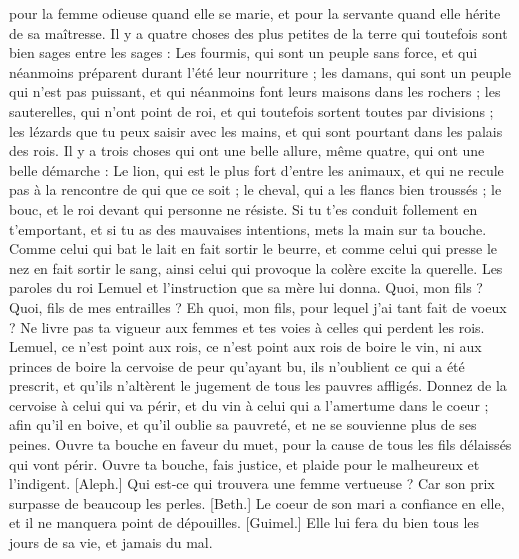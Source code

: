 \begin{multicols}{2}
pour la femme odieuse quand elle se marie, et pour la servante quand elle hérite de sa maîtresse.
Il y a quatre choses des plus petites de la terre qui toutefois sont bien sages entre les sages :
Les fourmis, qui sont un peuple sans force, et qui néanmoins préparent durant l'été leur nourriture ;
les damans, qui sont un peuple qui n’est pas puissant, et qui néanmoins font leurs maisons dans les rochers ;
les sauterelles, qui n'ont point de roi, et qui toutefois sortent toutes par divisions ;
les lézards que tu peux saisir avec les mains, et qui sont pourtant dans les palais des rois.
Il y a trois choses qui ont une belle allure, même quatre, qui ont une belle démarche :
Le lion, qui est le plus fort d'entre les animaux, et qui ne recule pas à la rencontre de qui que ce soit ;
le cheval, qui a les flancs bien troussés ; le bouc, et le roi devant qui personne ne résiste.
Si tu t’es conduit follement en t’emportant, et si tu as des mauvaises intentions, mets la main sur ta bouche.
Comme celui qui bat le lait en fait sortir le beurre, et comme celui qui presse le nez en fait sortir le sang, ainsi celui qui provoque la colère excite la querelle.
\VerseOne{}Les paroles du roi Lemuel et l'instruction que sa mère lui donna.
Quoi, mon fils ? Quoi, fils de mes entrailles ? Eh quoi, mon fils, pour lequel j'ai tant fait de voeux ?
Ne livre pas ta vigueur aux femmes et tes voies à celles qui perdent les rois.
Lemuel, ce n'est point aux rois, ce n'est point aux rois de boire le vin, ni aux princes de boire la cervoise
de peur qu'ayant bu, ils n'oublient ce qui a été prescrit, et qu'ils n'altèrent le jugement de tous les pauvres affligés.
Donnez de la cervoise à celui qui va périr, et du vin à celui qui a l'amertume dans le coeur ;
afin qu'il en boive, et qu'il oublie sa pauvreté, et ne se souvienne plus de ses peines.
Ouvre ta bouche en faveur du muet, pour la cause de tous les fils délaissés qui vont périr.
Ouvre ta bouche, fais justice, et plaide pour le malheureux et l’indigent.
[Aleph.] Qui est-ce qui trouvera une femme vertueuse ? Car son prix surpasse de beaucoup les perles.
[Beth.] Le coeur de son mari a confiance en elle, et il ne manquera point de dépouilles.
[Guimel.] Elle lui fera du bien tous les jours de sa vie, et jamais du mal.

\end{multicols}
